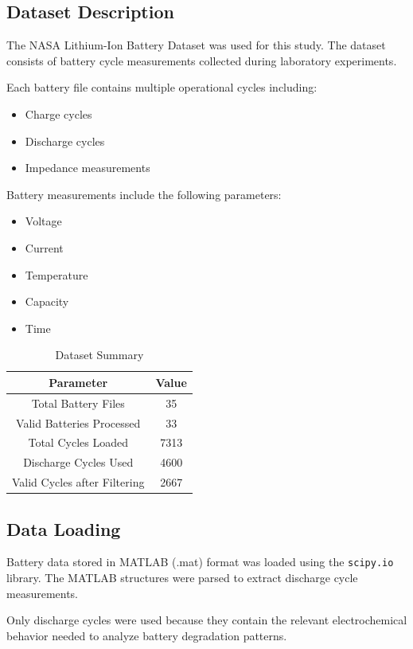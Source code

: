 \subsection{Dataset Description}

The NASA Lithium-Ion Battery Dataset was used for this study. The dataset consists of battery cycle measurements collected during laboratory experiments.

Each battery file contains multiple operational cycles including:

\begin{itemize}
\item Charge cycles
\item Discharge cycles
\item Impedance measurements
\end{itemize}

Battery measurements include the following parameters:

\begin{itemize}
\item Voltage
\item Current
\item Temperature
\item Capacity
\item Time
\end{itemize}

\begin{table}[h]
\centering
\caption{Dataset Summary}
\begin{tabular}{|c|c|}
\hline
Parameter & Value \\
\hline
Total Battery Files & 35 \\
Valid Batteries Processed & 33 \\
Total Cycles Loaded & 7313 \\
Discharge Cycles Used & 4600 \\
Valid Cycles after Filtering & 2667 \\
\hline
\end{tabular}
\end{table}

\subsection{Data Loading}

Battery data stored in MATLAB (.mat) format was loaded using the \texttt{scipy.io} library. The MATLAB structures were parsed to extract discharge cycle measurements.

Only discharge cycles were used because they contain the relevant electrochemical behavior needed to analyze battery degradation patterns.

